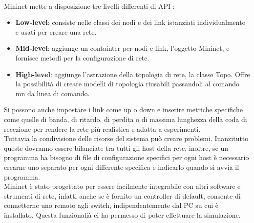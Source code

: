 \\Mininet mette a disposizione tre livelli differenti di API \cite{introMin}:
\begin{itemize}
\item \textbf{Low-level}: consiste nelle classi dei nodi e dei link istanziati individualmente e usati per creare una rete.
\item \textbf{Mid-level}: aggiunge un containter per nodi e link, l'oggetto Mininet, e fornisce metodi per la configurazione di rete.
\item \textbf{High-level}: aggiunge l'astrazione della topologia di rete, la classe Topo. Offre la possibilità di creare modelli di topologia riusabili passandoli al comando mn da linea di comando.
\end{itemize}
Si possono anche impostare i link come up o down e inserire metriche specifiche 
come quelle di banda, di ritardo, di perdita o di massima lunghezza della coda di recezione per rendere la rete più realistica e adatta a esperimenti.
\\Tuttavia la condivisione delle risorse del sistema può creare problemi.
Inanzitutto queste dovranno essere bilanciate tra tutti gli host della rete,
inoltre, se un programma ha bisogno di file di configurazione specifici per ogni host è necessario crearne uno separato per ogni differente specifica e indicarlo quando si avvia il programma.
\\Mininet è stato progettato per essere facilmente integrabile con altri software e strumenti di rete,
infatti anche se è fornito un controller di default, consente di connetterne uno remoto agli switch, indipendentemente dal PC su cui è installato.
Questa funzionalià ci ha permesso di poter effettuare la simulazione.
